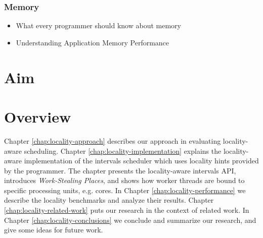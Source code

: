 \subsubsection{Memory}
\label{sec:lr-memory}

\begin{itemize}
\item[\textbullet] What every programmer should know about memory
  \cite{Drepper2007}
\item[\textbullet] Understanding Application Memory Performance
  \cite{Drepper2008}
\end{itemize}

\section{Aim}
\label{sec:locality-intro-aim}


\section{Overview}
\label{sec:locality-intro-overview}

Chapter \ref{chap:locality-approach} describes our approach in
evaluating locality-aware scheduling. Chapter
\ref{chap:locality-implementation} explains the locality-aware
implementation of the intervals scheduler which uses locality hints
provided by the programmer. The chapter presents the locality-aware
intervals API, introduces \emph{Work-Stealing Places}, and shows how
worker threads are bound to specific processing units, e.g. cores.  In
Chapter \ref{chap:locality-performance} we describe the locality
benchmarks and analyze their results. Chapter
\ref{chap:locality-related-work} puts our research in the context of
related work. In Chapter \ref{chap:locality-conclusions} we conclude
and summarize our research, and give some ideas for future work.



